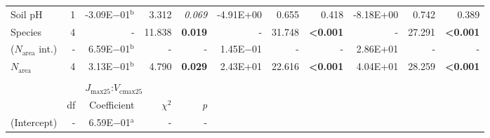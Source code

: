 \begin{landscape}
\begin{table}
{\begin{tabular}{p{2.5cm}p{0.5cm}p{2cm}p{1.5cm}p{1.5cm}p{2cm}p{1.5cm}p{1.5cm}p{2cm}p{1.5cm}p{1.5cm}}
            Soil pH & \multicolumn{1}{r}{1}
            & \multicolumn{1}{r}{-3.09E$-$01$^\mathrm{b}$} & \multicolumn{1}{r}{3.312} & \multicolumn{1}{r}{\textit{0.069}}
            & \multicolumn{1}{r}{-4.91E+00}                    & \multicolumn{1}{r}{0.655} & \multicolumn{1}{r}{0.418}
            & \multicolumn{1}{r}{-8.18E+00}                    & \multicolumn{1}{r}{0.742} & \multicolumn{1}{r}{0.389} 
            \\

            Species & \multicolumn{1}{r}{4}
            & \multicolumn{1}{r}{-} & \multicolumn{1}{r}{11.838} & \multicolumn{1}{r}{\textbf{0.019}}
            & \multicolumn{1}{r}{-} & \multicolumn{1}{r}{31.748} & \multicolumn{1}{r}{\textbf{\textless{}0.001}}
            & \multicolumn{1}{r}{-} & \multicolumn{1}{r}{27.291} & \multicolumn{1}{r}{\textbf{\textless{}0.001}}
            \\
            \hline

            ($N_\mathrm{area}$ int.) & \multicolumn{1}{r}{-}
            & \multicolumn{1}{r}{6.59E$-$01$^\mathrm{b}$} & \multicolumn{1}{r}{-} & \multicolumn{1}{r}{-}
            & \multicolumn{1}{r}{1.45E$-$01}                    & \multicolumn{1}{r}{-} & \multicolumn{1}{r}{-}
            & \multicolumn{1}{r}{2.86E+01}                    & \multicolumn{1}{r}{-} & \multicolumn{1}{r}{-}
            \\

            $N_\mathrm{area}$ & \multicolumn{1}{r}{4}
            & \multicolumn{1}{r}{3.13E$-$01$^\mathrm{b}$} & \multicolumn{1}{r}{4.790} & \multicolumn{1}{r}{\textbf{0.029}}
            & \multicolumn{1}{r}{2.43E+01}                    & \multicolumn{1}{r}{22.616} & \multicolumn{1}{r}{\textbf{\textless{}0.001}}
            & \multicolumn{1}{r}{4.04E+01}                    & \multicolumn{1}{r}{28.259} & \multicolumn{1}{r}{\textbf{\textless{}0.001}}
            \\
            \hline
            &&&&&&&&&&
            \\

            && \multicolumn{3}{l}{$J_\mathrm{max25}$:$V_\mathrm{cmax25}$} &&&&& \\
            \hline
            & \multicolumn{1}{r}{df}
            & \multicolumn{1}{r}{Coefficient} & \multicolumn{1}{r}{$\chi^{2}$} & \multicolumn{1}{r}{\textit{p}} 
            \\
            \hline

            (Intercept) & \multicolumn{1}{r}{-}
            & \multicolumn{1}{r}{6.59E$-$01$^\mathrm{a}$} & \multicolumn{1}{r}{-} & \multicolumn{1}{r}{-}
            &&&&&&
            \\


\end{tabular}}
\end{table}
\end{landscape}
